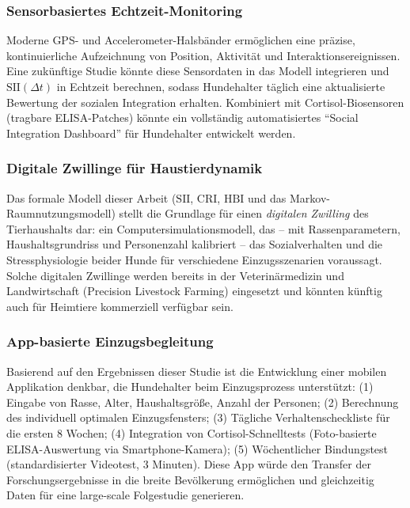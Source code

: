 ﻿\documentclass[12pt, a4paper]{article}
\theoremstyle{plain}
\theoremstyle{definition}
\theoremstyle{remark}
\newcommand{\HBI}{\mathrm{HBI}}
\newcommand{\SII}{\mathrm{SII}}
\newcommand{\CRI}{\mathrm{CRI}}
\newcommand{\dt}{\Delta t}
\begin{document}
\subsubsection{Sensorbasiertes Echtzeit-Monitoring}

Moderne GPS- und Accelerometer-Halsbänder ermöglichen eine präzise,
kontinuierliche Aufzeichnung von Position, Aktivität und Interaktionsereignissen.
Eine zukünftige Studie könnte diese Sensordaten in das Modell integrieren und
$\SII(\dt)$ in Echtzeit berechnen, sodass Hundehalter täglich eine aktualisierte
Bewertung der sozialen Integration erhalten. Kombiniert mit Cortisol-Biosensoren
(tragbare ELISA-Patches) könnte ein vollständig automatisiertes
``Social Integration Dashboard'' für Hundehalter entwickelt werden.

\subsubsection{Digitale Zwillinge für Haustierdynamik}

Das formale Modell dieser Arbeit ($\SII$, $\CRI$, $\HBI$ und das
Markov-Raumnutzungsmodell) stellt die Grundlage für einen \emph{digitalen
Zwilling} des Tierhaushalts dar: ein Computersimulationsmodell, das -- mit
Rassenparametern, Haushaltsgrundriss und Personenzahl kalibriert -- das
Sozialverhalten und die Stressphysiologie beider Hunde für verschiedene
Einzugsszenarien voraussagt. Solche digitalen Zwillinge werden bereits in
der Veterinärmedizin und Landwirtschaft (Precision Livestock Farming)
eingesetzt und könnten künftig auch für Heimtiere kommerziell verfügbar
sein.

\subsubsection{App-basierte Einzugsbegleitung}

Basierend auf den Ergebnissen dieser Studie ist die Entwicklung einer
mobilen Applikation denkbar, die Hundehalter beim Einzugsprozess unterstützt:
(1) Eingabe von Rasse, Alter, Haushaltsgröße, Anzahl der Personen;
(2) Berechnung des individuell optimalen Einzugsfensters;
(3) Tägliche Verhaltenscheckliste für die ersten 8 Wochen;
(4) Integration von Cortisol-Schnelltests (Foto-basierte ELISA-Auswertung
via Smartphone-Kamera);
(5) Wöchentlicher Bindungstest (standardisierter Videotest, 3 Minuten).
Diese App würde den Transfer der Forschungsergebnisse in die breite
Bevölkerung ermöglichen und gleichzeitig Daten für eine large-scale
Folgestudie generieren.
\end{document}
